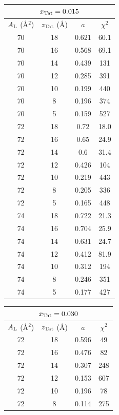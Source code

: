 \begin{table}[p]
  \centering
  \begin{tabular}{cccc}
    \multicolumn{4}{c}{$x_\textrm{Tat}=0.015$} \\
    \hline
    \rule{0pt}{14pt} %
    $A_\textrm{L}$ (\AA$^2$) & $z_\textrm{Tat}$ (\AA) & $a$ & $\chi^2$ \\
    \hline
    70 & 18 & 0.621 & 60.1 \\
    70 & 16 & 0.568 & 69.1 \\
    70 & 14 & 0.439 & 131 \\ 
    70 & 12 & 0.285 & 391 \\
    70 & 10 & 0.199 & 440 \\
    70 & 8  & 0.196 & 374 \\
    70 & 5  & 0.159	& 527 \\
    \hline
    72 & 18 & 0.72  & 18.0 \\
    72 & 16 & 0.65  & 24.9 \\
    72 & 14 & 0.6   & 31.4 \\
    72 & 12 & 0.426	& 104 \\
    72 & 10 & 0.219 & 443 \\
    72 & 8  & 0.205 & 336 \\
    72 & 5  & 0.165 & 448 \\
    \hline
    74 & 18 & 0.722 & 21.3 \\
    74 & 16 & 0.704	& 25.9 \\
    74 & 14 & 0.631 & 24.7 \\
    74 & 12 & 0.412 & 81.9 \\
    74 & 10 & 0.312 & 194 \\
    74 & 8  & 0.246 & 351 \\
    74 & 5  & 0.177 & 427 \\
    \hline
  \end{tabular}
  \qquad
  \begin{tabular}{c c c c}
    \multicolumn{4}{c}{$x_\textrm{Tat}=0.030$} \\
    \hline
    \rule{0pt}{14pt} %
    $A_\textrm{L}$ (\AA$^2$) & $z_\textrm{Tat}$ (\AA) & $a$ & $\chi^2$ \\
    \hline
    72 & 18 & 0.596 & 49  \\
    72 & 16 & 0.476 & 82  \\
    72 & 14 & 0.307 & 248 \\ 
    72 & 12 & 0.153 & 607 \\
    72 & 10 & 0.196 & 78  \\
    72 & 8  & 0.114 & 275 \\

\end{tabular}
\end{table}
